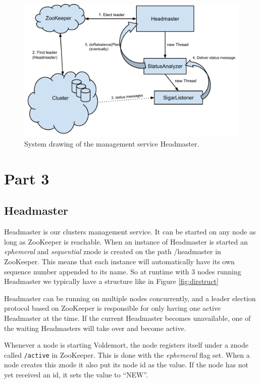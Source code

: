 \begin{figure}[h]
    \centering
    \includegraphics[width=1.0\textwidth]{implementation/Headmaster}
    \caption{System drawing of the management service Headmaster.}
    \label{fig:headmaster}
\end{figure}

\section{Part 3}
\subsection{Headmaster}

Headmaster is our clusters management service. It can be started on any node as long as ZooKeeper is reachable. When an instance of Headmaster is started an \emph{ephemeral} and \emph{sequential} znode is created on the path /headmaster in ZooKeeper. This means that each instance will automatically have its own sequence number appended to its name. So at runtime with 3 nodes running Headmaster we typically have a structure like in Figure \ref{fig:dirstruct}

Headmaster can be running on multiple nodes concurrently, and a leader election protocol based on ZooKeeper is responsible for only having one active Headmaster at the time. If the current Headmaster becomes unavailable, one of the waiting Headmasters will take over and become active. 

Whenever a node is starting Voldemort, the node registers itself under a znode called \texttt{/active} in ZooKeeper. This is done with the \emph{ephemeral} flag set. When a node creates this znode it also put its node id as the value. If the node has not yet received an id, it sets the value to ``NEW''. 

